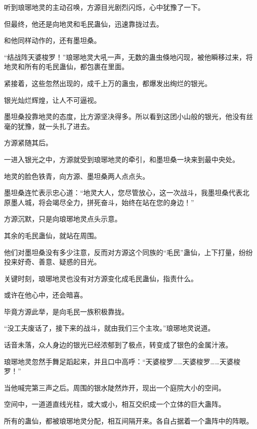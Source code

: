 
\begin{this_body}

听到琅琊地灵的主动召唤，方源目光剧烈闪烁，心中犹豫了一下。

但最终，他还是向地灵和毛民蛊仙，迅速靠拢过去。

和他同样动作的，还有墨坦桑。

“结战阵天婆梭罗！”琅琊地灵大吼一声，无数的蛊虫倏地闪现，被他瞬移过来，将地灵和所有的毛民蛊仙，都包裹在里面。

紧接着，这些忽然出现的，成千上万的蛊虫，都爆发出绚烂的银光。

银光灿烂辉煌，让人不可逼视。

墨坦桑投靠地灵的态度，比方源坚决得多。所以看到这团小山般的银光，他没有丝毫的犹豫，就一头扎了进去。

方源紧随其后。

一进入银光之中，方源就受到琅琊地灵的牵引，和墨坦桑一块来到最中央处。

地灵的脸色铁青，向方源、墨坦桑两人点点头。

墨坦桑连忙表示忠心道：“地灵大人，您尽管放心，这一次战斗，我墨坦桑代表北原墨人城，将会竭尽全力，拼死奋斗，始终在站在您的身边！”

方源沉默，只是向琅琊地灵点头示意。

其余的毛民蛊仙，就站在周围。

他们对墨坦桑没有多少注意，反而对方源这个同族的“毛民”蛊仙，上下打量，纷纷投来好奇、善意、疑惑的目光。

关键时刻，琅琊地灵也没有对方源变化成毛民蛊仙，指责什么。

或许在他心中，还会暗喜。

毕竟方源此举，是向毛民一族积极靠拢。

“没工夫废话了，接下来的战斗，就由我们三个主攻。”琅琊地灵说道。

话音未落，众人身边的银光已经浓郁到了极点，转变成了银色的金属汁液。

琅琊地灵忽然手舞足蹈起来，并且口中高呼：“天婆梭罗……天婆梭罗……天婆梭罗！”

当他喊完第三声之后。周围的银水陡然炸开，现出一个庭院大小的空间。

空间中，一道道直线光柱，或大或小，相互交织成一个立体的巨大蛊阵。

所有的蛊仙，都被琅琊地灵分配，相互间隔开来。各自占据着一个蛊阵中的阵眼。


\end{this_body}
